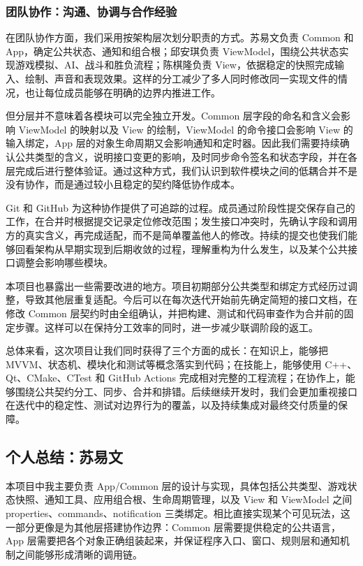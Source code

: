 \documentclass[a4paper]{article}
\begin{document}
\subsubsection{团队协作：沟通、协调与合作经验}

在团队协作方面，我们采用按架构层次划分职责的方式。苏易文负责 Common 和 App，确定公共状态、通知和组合根；邱安琪负责 ViewModel，围绕公共状态实现游戏模拟、AI、战斗和胜负流程；陈棋隆负责 View，依据稳定的快照完成输入、绘制、声音和表现效果。这样的分工减少了多人同时修改同一实现文件的情况，也让每位成员能够在明确的边界内推进工作。

但分层并不意味着各模块可以完全独立开发。Common 层字段的命名和含义会影响 ViewModel 的映射以及 View 的绘制，ViewModel 的命令接口会影响 View 的输入绑定，App 层的对象生命周期又会影响通知和定时器。因此我们需要持续确认公共类型的含义，说明接口变更的影响，及时同步命令签名和状态字段，并在各层完成后进行整体验证。通过这种方式，我们认识到软件模块之间的低耦合并不是没有协作，而是通过较小且稳定的契约降低协作成本。

Git 和 GitHub 为这种协作提供了可追踪的过程。成员通过阶段性提交保存自己的工作，在合并时根据提交记录定位修改范围；发生接口冲突时，先确认字段和调用方的真实含义，再完成适配，而不是简单覆盖他人的修改。持续的提交也使我们能够回看架构从早期实现到后期收敛的过程，理解重构为什么发生，以及某个公共接口调整会影响哪些模块。

本项目也暴露出一些需要改进的地方。项目初期部分公共类型和绑定方式经历过调整，导致其他层重复适配。今后可以在每次迭代开始前先确定简短的接口文档，在修改 Common 层契约时由全组确认，并把构建、测试和代码审查作为合并前的固定步骤。这样可以在保持分工效率的同时，进一步减少联调阶段的返工。

总体来看，这次项目让我们同时获得了三个方面的成长：在知识上，能够把 MVVM、状态机、模块化和测试等概念落实到代码；在技能上，能够使用 C++、Qt、CMake、CTest 和 GitHub Actions 完成相对完整的工程流程；在协作上，能够围绕公共契约分工、同步、合并和排错。后续继续开发时，我们会更加重视接口在迭代中的稳定性、测试对边界行为的覆盖，以及持续集成对最终交付质量的保障。


\subsection{个人总结：苏易文}

本项目中我主要负责 App/Common 层的设计与实现，具体包括公共类型、游戏状态快照、通知工具、应用组合根、生命周期管理，以及 View 和 ViewModel 之间 properties、commands、notification 三类绑定。相比直接实现某个可见玩法，这一部分更像是为其他层搭建协作边界：Common 层需要提供稳定的公共语言，App 层需要把各个对象正确组装起来，并保证程序入口、窗口、规则层和通知机制之间能够形成清晰的调用链。
\end{document}
